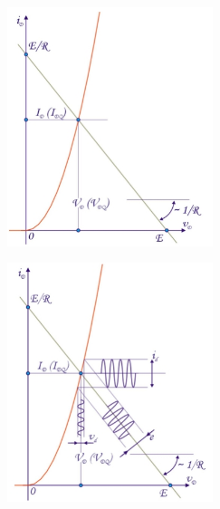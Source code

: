 \begin{figure}[h!]
	\centering
	\begin{minipage}{.5\textwidth}
		\centering
		\includegraphics[width=6cm]{figures/ch02/small_signal_resp4.jpg}
		\label{fig:small_signal_resp4}
	\end{minipage}%
	\begin{minipage}{.5\textwidth}
		\centering
		\includegraphics[width=6cm]{figures/ch02/small_signal_resp6.jpg}
		\label{fig:small_signal_resp6}
	\end{minipage}
\end{figure}

